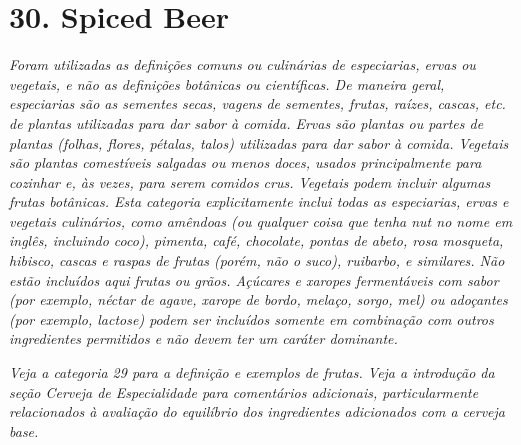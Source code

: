 \section*{30. Spiced Beer}
\textit{Foram utilizadas as definições comuns ou culinárias de especiarias, ervas ou vegetais, e não as definições botânicas ou científicas. De maneira geral, especiarias são as sementes secas, vagens de sementes, frutas, raízes, cascas, etc. de plantas utilizadas para dar sabor à comida. Ervas são plantas ou partes de plantas (folhas, flores, pétalas, talos) utilizadas para dar sabor à comida. Vegetais são plantas comestíveis salgadas ou menos doces, usados principalmente para cozinhar e, às vezes, para serem comidos crus. Vegetais podem incluir algumas frutas botânicas. Esta categoria explicitamente inclui todas as especiarias, ervas e vegetais culinários, como amêndoas (ou qualquer coisa que tenha nut no nome em inglês, incluindo coco), pimenta, café, chocolate, pontas de abeto, rosa mosqueta, hibisco, cascas e raspas de frutas (porém, não o suco), ruibarbo, e similares. Não estão incluídos aqui frutas ou grãos. Açúcares e xaropes fermentáveis com sabor (por exemplo, néctar de agave, xarope de bordo, melaço, sorgo, mel) ou adoçantes (por exemplo, lactose) podem ser incluídos somente em combinação com outros ingredientes permitidos e não devem ter um caráter dominante.}

\textit{Veja a categoria 29 para a definição e exemplos de frutas. Veja a introdução da seção Cerveja de Especialidade para comentários adicionais, particularmente relacionados à avaliação do equilíbrio dos ingredientes adicionados com a cerveja base.}

